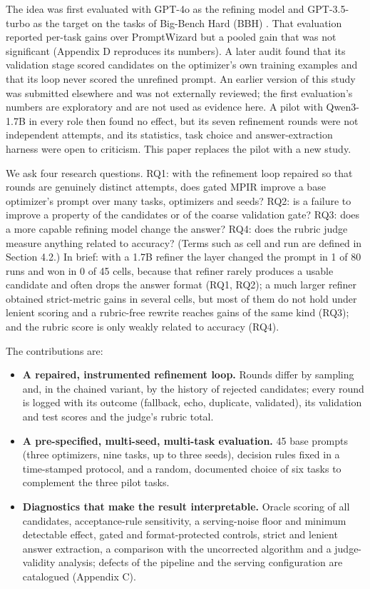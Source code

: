 \documentclass{ieeeaccess}
\begin{document}
The idea was first evaluated with GPT-4o as the refining model and GPT-3.5-turbo as the target on the tasks of Big-Bench Hard (BBH) \cite{suzgun2023}. That evaluation reported per-task gains over PromptWizard \cite{agarwal2025} but a pooled gain that was not significant (Appendix D reproduces its numbers). A later audit found that its validation stage scored candidates on the optimizer's own training examples and that its loop never scored the unrefined prompt. An earlier version of this study was submitted elsewhere and was not externally reviewed; the first evaluation's numbers are exploratory and are not used as evidence here. A pilot with Qwen3-1.7B in every role then found no effect, but its seven refinement rounds were not independent attempts, and its statistics, task choice and answer-extraction harness were open to criticism. This paper replaces the pilot with a new study.

We ask four research questions. RQ1: with the refinement loop repaired so that rounds are genuinely distinct attempts, does gated MPIR improve a base optimizer's prompt over many tasks, optimizers and seeds? RQ2: is a failure to improve a property of the candidates or of the coarse validation gate? RQ3: does a more capable refining model change the answer? RQ4: does the rubric judge measure anything related to accuracy? (Terms such as cell and run are defined in Section 4.2.) In brief: with a 1.7B refiner the layer changed the prompt in 1 of 80 runs and won in 0 of 45 cells, because that refiner rarely produces a usable candidate and often drops the answer format (RQ1, RQ2); a much larger refiner obtained strict-metric gains in several cells, but most of them do not hold under lenient scoring and a rubric-free rewrite reaches gains of the same kind (RQ3); and the rubric score is only weakly related to accuracy (RQ4).

The contributions are:

\begin{itemize}
\item \textbf{A repaired, instrumented refinement loop.} Rounds differ by sampling and, in the chained variant, by the history of rejected candidates; every round is logged with its outcome (fallback, echo, duplicate, validated), its validation and test scores and the judge's rubric total.
\item \textbf{A pre-specified, multi-seed, multi-task evaluation.} 45 base prompts (three optimizers, nine tasks, up to three seeds), decision rules fixed in a time-stamped protocol, and a random, documented choice of six tasks to complement the three pilot tasks.
\item \textbf{Diagnostics that make the result interpretable.} Oracle scoring of all candidates, acceptance-rule sensitivity, a serving-noise floor and minimum detectable effect, gated and format-protected controls, strict and lenient answer extraction, a comparison with the uncorrected algorithm and a judge-validity analysis; defects of the pipeline and the serving configuration are catalogued (Appendix C).
\end{itemize}
\end{document}
